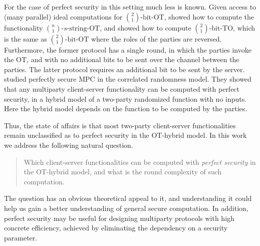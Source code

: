 \documentclass{llncs}
\newcommand{\bOT}[2]{\binom{#2}{#1}\text{-bit-OT}}
\newcommand{\TO}[2]{\binom{#2}{#1}\text{-bit-TO}}
\newcommand{\sOT}[3]{\binom{#2}{#1}\text{-}#3\text{-string-OT}}
\begin{document}
For the case of perfect security in this setting much less is known. Given access to (many parallel) ideal computations for $\bOT12$, \citet{BCS96} showed how to compute the functionality $\sOT{1}{n}{s}$, and \citet{WolfW06} showed how to compute $\TO{1}{2}$, which is the same as $\bOT{1}{2}$ where the roles of the parties are reversed. Furthermore, the former protocol has a single round, in which the parties invoke the OT, and with no additional bits to be sent over the channel between the parties. The latter protocol requires an additional bit to be sent by the server. \citet{IKMOP13} studied perfectly secure MPC in the correlated randomness model. They showed that any multiparty client-server functionality can be computed with perfect security, in a hybrid model of a two-party randomized function with no inputs. Here the hybrid model depends on the function to be computed by the parties.


Thus, the state of affairs is that most two-party client-server functionalities remain unclassified as to perfect security in the OT-hybrid model. In this work we address the following natural question.
\begin{quote}
Which client-server functionalities can be computed with \emph{perfect security} in the OT-hybrid model, and what is the round complexity of such computation. 
\end{quote}
The question has an obvious theoretical appeal to it, and understanding it could help us gain a better understanding of general secure computation. In addition, perfect security may be useful for designing multiparty protocols with high concrete efficiency, achieved by eliminating the dependency on a security parameter.

\end{document}
